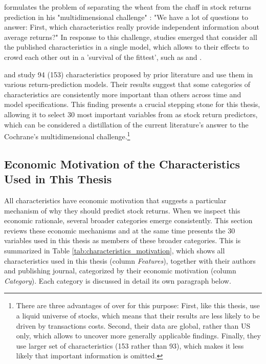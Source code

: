 			\citeauthor{cochrane2011presidential} formulates the problem of separating the wheat from the chaff in stock returns prediction in his "multidimensional challenge" \citep[p.~1060]{cochrane2011presidential}: "We have a lot of questions to answer: First, which characteristics really provide independent information about average returns?" In response to this challenge, studies emerged that consider all the published characteristics in a single model, which allows to their effects to crowd each other out in a 'survival of the fittest', such as \cite{gu2020empirical} and \cite{tobek2020does}. 
			
			\cite{gu2020empirical} and \cite{tobek2020does} study 94 (153) characteristics proposed by prior literature and use them in various return-prediction models. Their results suggest that some categories of characteristics are consistently more important than others across time and model specifications. This finding presents a crucial stepping stone for this thesis, allowing it to select 30 most important variables from \cite{tobek2020does} as stock return predictors, which can be considered a distillation of the current literature's answer to the Cochrane's multidimensional challenge.\footnote{There are three advantages of \cite{tobek2020does} over \cite{gu2020empirical} for this purpose: First, like this thesis,  \cite{tobek2020does} use a liquid universe of stocks, which means that their results are less likely to be driven by transactions costs. Second, their data are global, rather than US only, which allows to uncover more generally applicable findings. Finally, they use larger set of characteristics (153 rather than 93), which makes it less likely that important information is omitted.} 
			
		\subsection{Economic Motivation of the Characteristics Used in This Thesis}
			\label{chap:economic_motivation_of_predictors}
			
			All characteristics have economic motivation that suggests a particular mechanism of why they should predict stock returns. When we inspect this economic rationale, several broader categories emerge consistently. This section reviews these economic mechanisms and at the same time presents the 30 variables used in this thesis as members of these broader categories. This is summarized in Table \ref{tab:characteristics_motivation}, which shows all characteristics used in this thesis (column \textit{Features}), together with their authors and publishing journal, categorized by their economic motivation (column \textit{Category}). Each category is discussed in detail its own paragraph below. 
			
